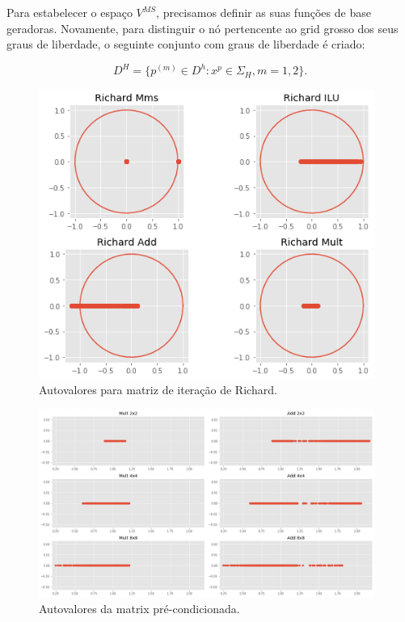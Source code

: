 Para estabelecer o espaço $V^{MS}$, precisamos definir as suas funções de base geradoras. 
Novamente, para distinguir o nó pertencente ao grid grosso dos seus graus de liberdade, o seguinte conjunto com graus de liberdade é criado:


\begin{equation}\label{eq:dheq}
    D^H = \{ p^{(m)} \in D^h : x^p \in \Sigma_H, m=1,2\}.
\end{equation}



\begin{figure}[!htbp]
\centering
\includegraphics[width=11cm]{chap06/figs/IteracaoRichard.png}
\caption{Autovalores para matriz de iteração de Richard.}
\label{fig:nnzGrafico}
\end{figure}

\begin{figure}[!htbp]
\centering
\includegraphics[width=11cm]{chap06/figs/AutovaloresMatPrecondicionada.png}
\caption{Autovalores da matrix pré-condicionada.}
\label{fig:nnzGrafico}
\end{figure}




